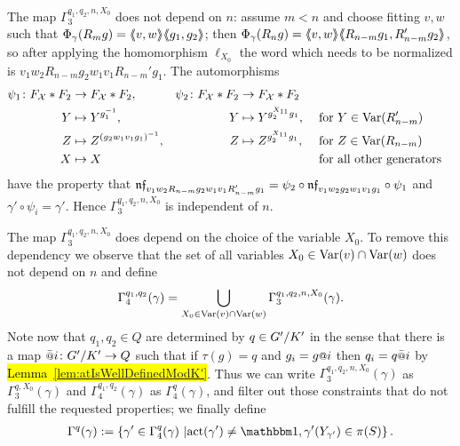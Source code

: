 \documentclass[a4paper,11pt]{amsart}
\begin{document}
 The map $\Gamma_3^{q_1,q_2,n,X_0}$ does not depend on $n$: assume 
 $m<n$ and choose fitting $v,w$ such that
 $\Phi_\gamma(R_mg)=\langle\negthickspace\langle v,w\rangle\negthickspace\rangle\langle\negthickspace\langle g_1,g_2\rangle\negthickspace\rangle$; then
 $\Phi_\gamma(R_ng)=\langle\negthickspace\langle v,w\rangle\negthickspace\rangle\langle\negthickspace\langle R_{n-m}g_1,R_{n-m}'g_2\rangle\negthickspace\rangle$, so after
 applying the homomorphism $\ell_{X_0}$ the word which needs to be
 normalized is $v_1w_2R_{n-m}g_2w_1v_1R_{n-m}'g_1$. The automorphisms
 \begin{align*}
 \psi_1 \colon F_{\mathcal{X}}*F_2 &\to F_{\mathcal{X}}*F_2, & \psi_2 \colon F_{\mathcal{X}}*F_2 &\to F_{\mathcal{X}}*F_2\\
 Y &\mapsto Y^{g_1^{-1}}, & Y &\mapsto Y^{g_2^{X_{11}}g_1}, & &\text{ for }Y\in \textup{Var}(R_{n-m}')\\
 Z &\mapsto Z^{(g_2w_1v_1g_1)^{-1}},& Z &\mapsto Z^{g_2^{X_{11}}g_1},  & &\text{ for }Z\in \textup{Var}(R_{n-m})\\
 X &\mapsto X & & & &\text{ for all other generators}
 \end{align*}
 have the property that $\mathfrak{nf}_{v_1w_2R_{n-m}g_2w_1v_1R_{n-m}'g_1} = \psi_2\circ\mathfrak{nf}_{v_1w_2g_2w_1v_1g_1}\circ \psi_1$ and 
 $\gamma' \circ \psi_i = \gamma'$. Hence $\Gamma_3^{q_1,q_2,n,X_0}$ is independent of $n$.
 
 The map $\Gamma_3^{q_1,q_2,n,X_0}$ does depend on the choice of the variable $X_0$.
 To remove this dependency we observe that the set of all variables 
 $X_0 \in \textup{Var}(v)\cap \textup{Var}(w)$ does not depend on $n$
and define
  \[\Gamma_4^{q_1,q_2}(\gamma)=  \bigcup_{X_0\in \textup{Var}(v)\cap\textup{Var}(w)}\Gamma_3^{q_1,q_2,n,X_0}(\gamma).\]
  Note now that $q_{1},q_2\in Q$ are determined by $q\in{G'/K'}$
  in the sense that there is a map $\att{i}\colon \RNK{G'}{K'}\to Q$
  such that if $\tau(g) = q$ and $g_i=g\at{i}$ then $q_i = q\att{i}$
  by \hl{{Lemma~\ref{lem:atIsWellDefinedModK'}}}.  Thus we can write 
  $\Gamma_3^{q_1,q_2,n,X_0}(\gamma)$ as $\Gamma_3^{q,X_0}(\gamma)$ and
  $\Gamma_4^{q_1,q_2}(\gamma)$ as $\Gamma_4^q(\gamma)$, and filter out
  those constraints that do not fulfill the requested properties; we
  finally define
 \begin{align}
 \Gamma^q(\gamma) := \left\{\gamma' \in \Gamma_4^q(\gamma) \bigmid 
  \act(\gamma')\neq\id, \gamma'({Y_{\gamma'}}) \in \pi(S) \right\}. 
  \label{def:Gammaq}
 \end{align}
\end{document}
